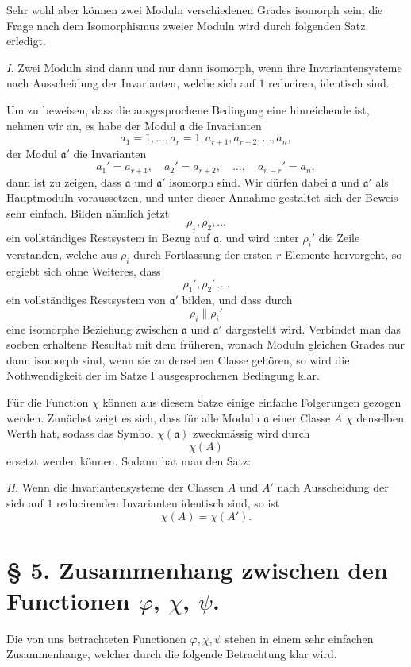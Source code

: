 \documentclass[11pt,a4paper]{article}
\begin{document}
Sehr wohl aber können zwei Moduln verschiedenen Grades isomorph sein; die Frage nach dem Isomorphismus zweier Moduln wird durch folgenden Satz erledigt.

\emph{I.} Zwei Moduln sind dann und nur dann isomorph, wenn ihre Invariantensysteme nach Ausscheidung der Invarianten, welche sich auf $1$ reduciren, identisch sind.

Um zu beweisen, dass die ausgesprochene Bedingung eine hinreichende ist, nehmen wir an, es habe der Modul $\mathfrak a$ die Invarianten
\[
 a_1=1,\ldots,a_r=1,a_{r+1},a_{r+2},\ldots,a_n,
\]
der Modul $\mathfrak a'$ die Invarianten
\[
 a_1'=a_{r+1},\quad a_2'=a_{r+2},\quad\ldots,\quad a_{n-r}'=a_n,
\]
dann ist zu zeigen, dass $\mathfrak a$ und $\mathfrak a'$ isomorph sind. Wir dürfen dabei $\mathfrak a$ und $\mathfrak a'$ als Hauptmoduln voraussetzen, und unter dieser Annahme gestaltet sich der Beweis sehr einfach. Bilden nämlich jetzt
\[
 \rho_1,\rho_2,\ldots
\]
ein vollständiges Restsystem in Bezug auf $\mathfrak a$, und wird unter $\rho_i'$ die Zeile verstanden, welche aus $\rho_i$ durch Fortlassung der ersten $r$ Elemente hervorgeht, so ergiebt sich ohne Weiteres, dass
\[
 \rho_1',\rho_2',\ldots
\]
ein vollständiges Restsystem von $\mathfrak a'$ bilden, und dass durch
\[
 \rho_i\parallel\rho_i'
\]
eine isomorphe Beziehung zwischen $\mathfrak a$ und $\mathfrak a'$ dargestellt wird. Verbindet man das soeben erhaltene Resultat mit dem früheren, wonach Moduln gleichen Grades nur dann isomorph sind, wenn sie zu derselben Classe gehören, so wird die Nothwendigkeit der im Satze I ausgesprochenen Bedingung klar.

Für die Function $\chi$ können aus diesem Satze einige einfache Folgerungen gezogen werden. Zunächst zeigt es sich, dass für alle Moduln $\mathfrak a$ einer Classe $A$ $\chi$ denselben Werth hat, sodass das Symbol $\chi(\mathfrak a)$ zweckmässig wird durch
\[
 \chi(A)
\]
ersetzt werden können. Sodann hat man den Satz:

\emph{II.} Wenn die Invariantensysteme der Classen $A$ und $A'$ nach Ausscheidung der sich auf $1$ reducirenden Invarianten identisch sind, so ist
\[
 \chi(A)=\chi(A').
\]

\section*{§ 5. Zusammenhang zwischen den Functionen $\varphi$, $\chi$, $\psi$.}

Die von uns betrachteten Functionen $\varphi,\chi,\psi$ stehen in einem sehr einfachen Zusammenhange, welcher durch die folgende Betrachtung klar wird.
\end{document}
